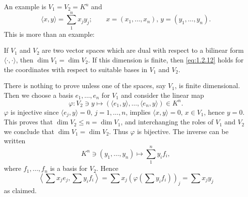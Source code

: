 An example is $V_1=V_2=K^n$ and
\begin{equation}
  \label{eq:1.2.12}
  \langle x,y\rangle=\sum_1^nx_jy_j;\qquad x=(x_1,\dots,x_n),\,y=(y_1,\dots,y_n).
\end{equation}
This is more than an example:
\begin{thm}
  \label{thm:1.2.13}
  If $V_1$ and $V_2$ are two vector spaces which are dual with respect
  to a bilinear form $\langle\cdot,\cdot\rangle$, then $\dim V_1=\dim
  V_2$. If this dimension is finite, then \eqref{eq:1.2.12} holds for
  the coordinates with respect to suitable bases in $V_1$ and $V_2$.
\end{thm}
\begin{prf}
  There is nothing to prove unless one of the spaces, say $V_1$, is
  finite dimensional. Then we choose a basis $e_1,\dots,e_n$ for $V_1$
  and consider the linear map
  \begin{displaymath}
    \varphi:V_2\ni y\mapsto (\langle e_1,y\rangle,\dots,\langle
    e_n,y\rangle)\in K^n.
  \end{displaymath}
$\varphi$ is injective since $\langle e_j,y\rangle=0,\,j=1,\dots,n$,
implies $\langle x,y\rangle=0,\,x\in V_1$, hence $y=0$. This proves
that $\dim V_2\leq n=\dim V_1$, and interchanging the roles of $V_1$
and $V_2$ we conclude that $\dim V_1=\dim V_2$. Thus $\varphi$ is
bijective. The inverse can be written
\begin{displaymath}
  K^n\ni (y_1,\dots,y_n)\mapsto\sum_1^ny_if_i,
\end{displaymath}
where $f_1,\dots,f_n$ is a basis for $V_2$. Hence
\begin{displaymath}
  \left\langle\sum x_je_j,\sum y_if_i\right\rangle=\sum x_j(\varphi(\sum
  y_if_i))_j=\sum x_jy_j
\end{displaymath}
as claimed.
\end{prf}

